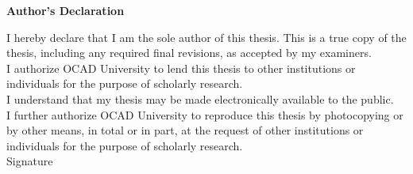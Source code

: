 \begin{center}
\large\textbf{Author's Declaration}
\end{center}

\normalsize
\noindent
I hereby declare that I am the sole author of this thesis. This is a true copy of the thesis, including any required final revisions, as accepted by my examiners.
\\[0.5cm]
I authorize OCAD University to lend this thesis to other institutions or individuals for the purpose of scholarly research.
\\[0.5cm]
I understand that my thesis may be made electronically available to the public.
\\[0.5cm]
I further authorize OCAD University to reproduce this thesis by photocopying or by other means, in total or in part, at the request of other institutions or individuals for the purpose of scholarly research.
\\[1cm]
Signature \hspace{0.25cm} \makebox[7.5cm]{\hrulefill}		%